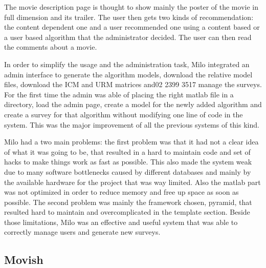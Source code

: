 The movie description page is thought to show mainly the poster of the movie in full dimension and its trailer. The user then gets two kinds of recommendation: the content dependent one and a user recommended one using a content based or a user based algorithm that the administrator decided. The user can then read the comments about a movie.

In order to simplify the usage and the administration task, Milo integrated an admin interface to generate the algorithm models, download the relative model files, download the \ac{ICM} and \ac{URM} matrices and02 2399 3517 manage the surveys. For the first time the admin was able of placing the right matlab file in a directory, load the admin page, create a model for the newly added algorithm and create a survey for that algorithm without modifying one line of code in the system. This was the major improvement of all the previous systems of this kind.

Milo had a two main problems: the first problem was that it had not a clear idea of what it was going to be, that resulted in a hard to maintain code and set of hacks to make things work as fast as possible. This also made the system weak due to many software bottlenecks caused by different databases and mainly by the available hardware for the project that was way limited. Also the matlab part was not optimized in order to reduce memory and free up space as soon as possible. The second problem was mainly the framework chosen, pyramid, that resulted hard to maintain and overcomplicated in the template section.
Beside those limitations, Milo was an effective and useful system that was able to correctly manage users and generate new surveys.

\subsection{Movish}
\label{sec:movish}

